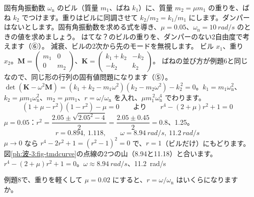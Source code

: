 \label{ph:波-3:ex8}
\begin{phreidai}
固有角振動数 $\omega_{\mathrm n}$ のビル（質量 $m_1$、ばね $k_1$）に、質量 $m_2=\mu m_1$ の重りを、ばね $k_2$ でつけます。重りはビルに同調させて $k_2/m_2=k_1/m_1$ にします。ダンパーはないとします。固有角振動数を求める式を導き、$\mu=0.05$、$\omega_{\mathrm n}=\qty{10}{rad/s}$ のときの値を求めましょう。
\phbamen
はてな？のビルの重りを、ダンパーのない2自由度で考えます（⑥）。
\phmushi
減衰、ビルの2次から先のモードを無視します。
\phzu
ビル $x_1$、重り $x_2$。$\mathbf M=\begin{pmatrix}m_1&0\\0&m_2\end{pmatrix}$、$\mathbf K=\begin{pmatrix}k_1+k_2&-k_2\\-k_2&k_2\end{pmatrix}$。
\phriyu
ばねの並び方が例題6と同じなので、同じ形の行列の固有値問題になります（⑤）。
\phtateru
$\det(\mathbf K-\omega^2\mathbf M)=(k_1+k_2-m_1\omega^2)(k_2-m_2\omega^2)-k_2^{\,2}=0$。$k_1=m_1\omega_{\mathrm n}^2$、$k_2=\mu m_1\omega_{\mathrm n}^2$、$m_2=\mu m_1$、$r=\omega/\omega_{\mathrm n}$ を入れ、$\mu m_1^{\,2}\omega_{\mathrm n}^4$ でわります。
\phtoku
\[(1+\mu-r^2)(1-r^2)-\mu=0\qquad\text{より}\qquad r^4-(2+\mu)r^2+1=0\]
$\mu=0.05$：$r^2=\dfrac{2.05\pm\sqrt{2.05^2-4}}{2}=\dfrac{2.05\pm0.45}{2}=0.8$、1.25。
\[r=0.894,\ 1.118,\qquad\omega=\qty{8.94}{rad/s},\ \qty{11.2}{rad/s}\]
\phtashikame
$\mu\to0$ なら $r^4-2r^2+1=(r^2-1)^2=0$ で、$r=1$（ビルだけ）にもどります。\\
図\ref{ph:波-3:fig-tmdcurve}の点線の2つの山（8.94と11.18）と合います。
\kotae $r^4-(2+\mu)r^2+1=0$。$\omega\approx\qty{8.94}{rad/s}$、\qty{11.2}{rad/s}
\end{phreidai}
\begin{jibun}
例題8で、重りを軽くして $\mu=0.02$ にすると、$r=\omega/\omega_{\mathrm n}$ はいくらになりますか。
\end{jibun}

